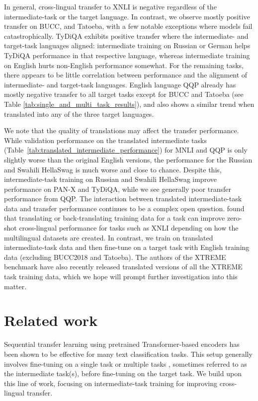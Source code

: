 \documentclass[11pt,a4paper]{article}
\begin{document}
In general, cross-lingual transfer to XNLI is negative regardless of the intermediate-task or the target language.
In contrast, we observe mostly positive transfer on BUCC, and Tatoeba, with a few notable exceptions where models fail catastrophically.
TyDiQA exhibits positive transfer where the intermediate- and target-task languages aligned: intermediate training on Russian or German helps TyDiQA performance in that respective language, whereas intermediate training on English hurts non-English performance somewhat.
For the remaining tasks, there appears to be little correlation between performance and the alignment of intermediate- and target-task languages.
English language QQP already has mostly negative transfer to all target tasks except for BUCC and Tatoeba (see Table \ref{tab:single_and_multi_task_results}), and also shows a similar trend when translated into any of the three target languages.

We note that the quality of translations may affect the transfer performance. While validation performance on the translated intermediate tasks (Table~\ref{tab:translated_intermediate_performance}) for MNLI and QQP is only slightly worse than the original English versions, the performance for the Russian and Swahili HellaSwag is much worse and close to chance. Despite this, intermediate-task training on Russian and Swahili HellaSwag improve performance on PAN-X and TyDiQA, while we see generally poor transfer performance from QQP.
The interaction between translated intermediate-task data and transfer performance continues to be a complex open question.
\citet{artetxe2020translation} found that translating or back-translating training data for a task can improve zero-shot cross-lingual performance for tasks such as XNLI depending on how the multilingual datasets are created.
In contrast, we train on translated intermediate-task data and then fine-tune on a target task with English training data (excluding BUCC2018 and Tatoeba).
The authors of the XTREME benchmark have also recently released translated versions of all the XTREME task training data, which we hope will prompt further investigation into this matter.

\section{Related work}

Sequential transfer learning using pretrained Transformer-based encoders \citep{Phang2018SentenceEO} has been shown to be effective for many text classification tasks. This setup generally involves fine-tuning on a single task \citep{pruksachatkun2020intermediate,vu2020exploring} or multiple tasks \citep{liu-etal-2019-multi,wang-etal-2019-tell,raffel2019t5paper}, sometimes referred to as the intermediate task(s), before fine-tuning on the target task.
We build upon this line of work, focusing on intermediate-task training for improving cross-lingual transfer.
\end{document}
